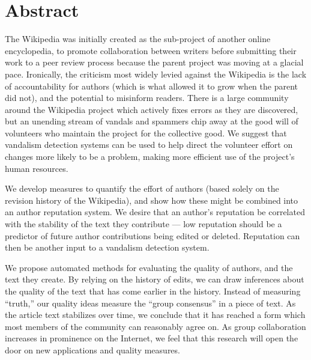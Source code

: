 \chapter{Abstract}
\begin{comment}
WikiTrust: Measuring Group Collaboration
by
B. Thomas Adler
\end{comment}

The Wikipedia was initially created as the sub-project of another
online encyclopedia, to promote collaboration between writers
before submitting their work to a peer review process because
the parent project was moving at a glacial pace.
Ironically, the criticism most widely levied against the Wikipedia
is the lack of accountability
for authors (which is what allowed it to grow when the parent did not),
and the potential to misinform readers.
There is a large community around the Wikipedia project which actively
fixes errors as they are discovered, but an unending
stream of vandals and spammers chip
away at the good will of volunteers who
maintain the project for the collective good.
We suggest that vandalism detection systems can be used to help direct
the volunteer effort on changes more likely to be a problem,
making more efficient use of the project's human resources.

We develop measures to quantify the effort of authors
(based solely on the revision history of the Wikipedia),
and show how these might be combined into an author
reputation system.
We desire that an author's reputation be correlated with the
stability of the text they contribute ---
low reputation should be a predictor of future author
contributions being edited or deleted.
Reputation can then be another input to a vandalism detection system.

We propose automated methods for evaluating the quality of
authors, and the text they create.
By relying on the history of edits, we can draw inferences about
the quality of the text that has come earlier in the history.
Instead of measuring ``truth,'' our quality ideas
measure the ``group consensus'' in a piece of text.
As the article text stabilizes over time, we conclude that
it has reached a form which most members of the community can
reasonably agree on.
As group collaboration increases in prominence on the Internet,
we feel that this research will open the door on new applications
and quality measures.

